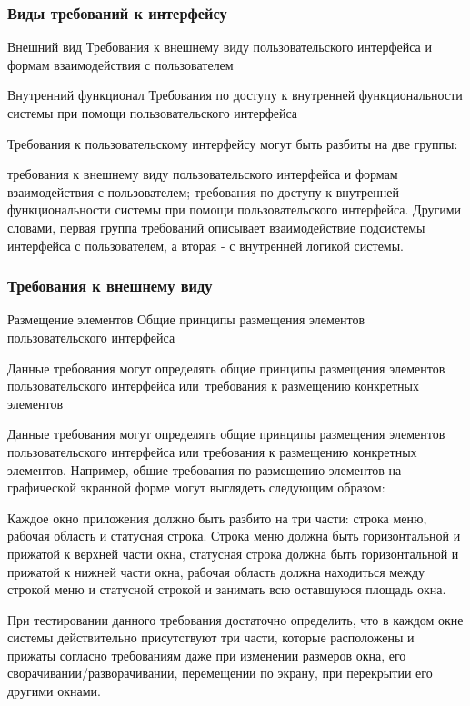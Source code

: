 \documentclass{../industrial-development}
\begin{document}
\begin{frame} \frametitle{Виды требований к интерфейсу}
  \begin{block}{Внешний вид}
   Требования к внешнему виду пользовательского интерфейса и формам взаимодействия с пользователем
  \end{block}
  \begin{block}{Внутренний функционал}
   Требования по доступу к внутренней функциональности системы при помощи пользовательского интерфейса
  \end{block}
\end{frame}

\lecturenotes

Требования к пользовательскому интерфейсу могут быть разбиты на две группы:

требования к внешнему виду пользовательского интерфейса и формам взаимодействия с пользователем;
требования по доступу к внутренней функциональности системы при помощи пользовательского интерфейса.
Другими словами, первая группа требований описывает взаимодействие подсистемы интерфейса с пользователем, а вторая - с внутренней логикой системы.

\begin{frame} \frametitle{Требования к внешнему виду}
  \begin{block}{Размещение элементов}
   Общие принципы размещения элементов пользовательского интерфейса
  \end{block}
Данные требования могут определять общие принципы размещения элементов пользовательского интерфейса или~требования к размещению конкретных элементов
\end{frame}

\lecturenotes

Данные требования могут определять общие принципы размещения элементов пользовательского интерфейса или требования к размещению конкретных элементов. Например, общие требования по размещению элементов на графической экранной форме могут выглядеть следующим образом:

Каждое окно приложения должно быть разбито на три части: строка меню, рабочая область и статусная строка. Строка меню должна быть горизонтальной и прижатой к верхней части окна, статусная строка должна быть горизонтальной и прижатой к нижней части окна, рабочая область должна находиться между строкой меню и статусной строкой и занимать всю оставшуюся площадь окна.

При тестировании данного требования достаточно определить, что в каждом окне системы действительно присутствуют три части, которые расположены и прижаты согласно требованиям даже при изменении размеров окна, его сворачивании/разворачивании, перемещении по экрану, при перекрытии его другими окнами.
\end{document}
